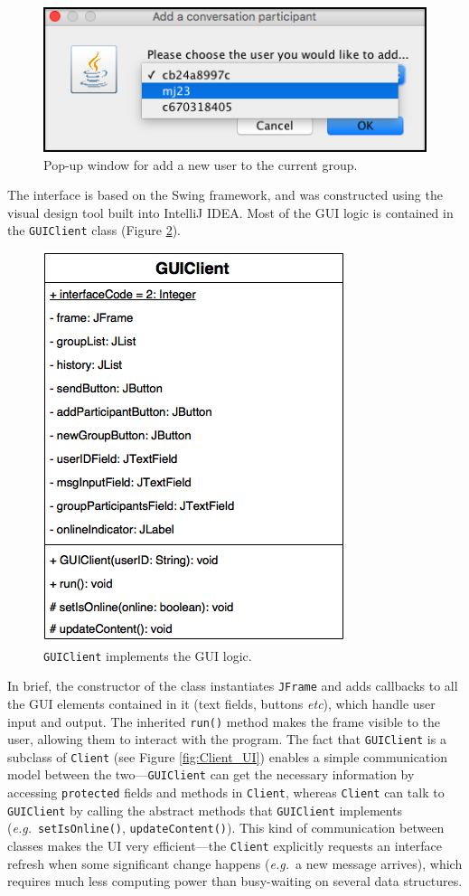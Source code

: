 \documentclass[a4paper, twoside, 12pt]{report}
\begin{document}
\begin{figure}[H]
    \captionsetup{width=0.84\textwidth}
    \centering
    \includegraphics[width=0.5\linewidth]{pics/GUI_add.png}
    \caption{\label{fig:GUI_add} Pop-up window for add a new user to the current group.}
\end{figure}

\restoregeometry

The interface is based on the Swing framework, and was constructed using the visual design tool built into IntelliJ IDEA. Most of the GUI logic is contained in the \texttt{GUIClient} class (Figure \ref{fig:GUIClient}).

\begin{figure}[H]
    \captionsetup{width=0.84\textwidth}
    \centering
    \includegraphics[width=0.45\linewidth]{pics/GUIClient.png}
    \caption{\label{fig:GUIClient} \texttt{GUIClient} implements the GUI logic.}
\end{figure}
In brief, the constructor of the class instantiates \texttt{JFrame} and adds callbacks to all the GUI elements contained in  it (text fields, buttons \textit{etc}), which handle user input and output. The inherited \texttt{run()} method makes the frame visible to the user, allowing them to interact with the program. The fact that \texttt{GUIClient} is a subclass of \texttt{Client} (see Figure \ref{fig:Client_UI}) enables a simple communication model between the two---\texttt{GUIClient} can get the necessary information by accessing \texttt{protected} fields and methods in \texttt{Client}, whereas \texttt{Client} can talk to \texttt{GUIClient} by calling the abstract methods that \texttt{GUIClient} implements (\textit{e.g.}~\texttt{setIsOnline()}, \texttt{updateContent()}). This kind of communication between classes makes the UI very efficient---the \texttt{Client} explicitly requests an interface refresh when some significant change happens (\textit{e.g.}~a new message arrives), which requires much less computing power than busy-waiting on several data structures.
\end{document}
